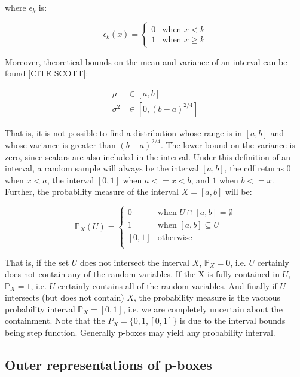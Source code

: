 \documentclass{juliacon}
\begin{document}
\noindent where $\epsilon_k$ is: 

\begin{equation*}
   \epsilon_k(x) = \begin{cases} 0 &\text{when } x < k \\ 1 &\text{when } x \geq k \end{cases}
\end{equation*}

Moreover, theoretical bounds on the mean and variance of an interval can be found [CITE SCOTT]:

\begin{align*}
  \mu &\in [a, b] \\
  \sigma^2 &\in [0, (b - a)^{2/4}]
\end{align*}

That is, it is not possible to find a distribution whose range is in $[a, b]$ and whose variance is greater than $(b-a)^{2/4}$. The lower bound on the variance is zero, since scalars are also included in the interval. Under this definition of an interval, a random sample will always be the interval $[a, b]$, the cdf returns 0 when $x < a$, the interval $[0,1]$ when $a <= x < b$, and $1$ when $b <= x$. Further, the probability measure of the interval $X = [a, b]$ will be: 

\begin{equation*}
  \mathbb{P}_{X}(U) = \begin{cases}
    0 & \text{when } U \cap [a,b] = \emptyset \\
    1 & \text{when } [a,b] \subseteq U  \\
    [0, 1] & \text{otherwise }\\
  \end{cases}
\end{equation*}

\noindent That is, if the set $U$ does not intersect the interval $X$, $\mathbb{P}_{X}=0$, i.e. $U$ certainly does not contain any of the random variables. If the X is fully contained in $U$, $\mathbb{P}_{X}=1$, i.e. $U$ certainly contains all of the random variables. And finally if $U$ intersects (but does not contain) $X$, the probability measure is the vacuous probability interval $\mathbb{P}_{X} = [0, 1]$, i.e. we are completely uncertain about the containment. Note that the $P_{X} = \{0, 1, [0,1]\}$ is due to the interval bounds being step function. Generally p-boxes may yield any probability interval.

\subsection{Outer representations of p-boxes}
\end{document}
